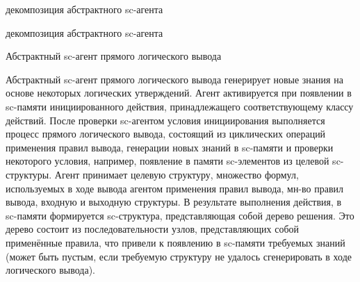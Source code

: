\begin{frame}{}
\topline
\justifying
\vspace{10mm}

\begin{SCn}
\begin{scnrelfromset}{декомпозиция абстрактного sc-агента}
\end{scnrelfromset}
\end{SCn}
\end{frame}

\begin{frame}{}
\begin{SCn}
    \begin{scnrelfromset}{декомпозиция абстрактного sc-агента}
\end{scnrelfromset}
\end{SCn}
\end{frame}

\begin{frame}{Абстрактный sc-агент прямого логического вывода}
\topline
\justifying
\vspace{10mm}
 
  Абстрактный sc-агент прямого логического вывода генерирует новые знания на основе некоторых логических утверждений. Агент активируется при появлении в sc-памяти инициированного действия, принадлежащего соответствующему классу действий. После проверки sc-агентом условия инициирования выполняется процесс прямого логического вывода, состоящий из циклических операций применения правил вывода, генерации новых знаний в sc-памяти и проверки некоторого условия, например, появление в памяти sc-элементов из целевой sc-структуры. Агент принимает целевую структуру, множество формул, используемых в ходе вывода агентом применения правил вывода, мн-во правил вывода, входную и выходную структуры. В результате выполнения действия, в sc-памяти формируется sc-структура, представляющая собой дерево решения. Это дерево состоит из последовательности узлов, представляющих собой применённые правила, что привели к появлению в sc-памяти требуемых знаний (может быть пустым, если требуемую структуру не удалось сгенерировать в ходе логического вывода).  
\end{frame}

